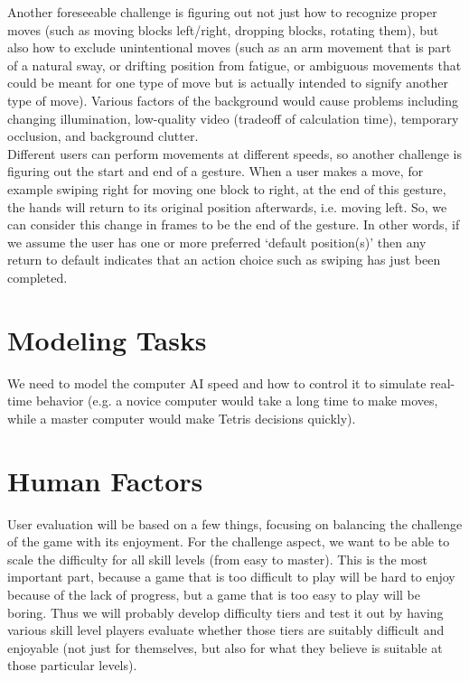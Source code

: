 \documentclass{article}
\begin{document}
	Another foreseeable challenge is figuring out not just how to recognize proper moves (such as moving blocks left/right, dropping blocks, rotating them), but also how to exclude unintentional moves (such as an arm movement that is part of a natural sway, or drifting position from fatigue, or ambiguous movements that could be meant for one type of move but is actually intended to signify another type of move). Various factors of the background would cause problems including changing illumination, low-quality video (tradeoff of calculation time), temporary occlusion, and background clutter.\\
	
	Different users can perform movements at different speeds, so another challenge is figuring out the start and end of a gesture. When a user makes a move, for example swiping right for moving one block to right, at the end of this gesture, the hands will return to its original position afterwards, i.e. moving left. So, we can consider this change in frames to be the end of the gesture. In other words, if we assume the user has one or more preferred ‘default position(s)’ then any return to default indicates that an action choice such as swiping has just been completed.\\
	
	
	\section{Modeling Tasks}
	We need to model the computer AI speed and how to control it to simulate real-time behavior (e.g. a novice computer would take a long time to make moves, while a master computer would make Tetris decisions quickly).\\
	\section{Human Factors}
	User evaluation will be based on a few things, focusing on balancing the challenge of the game with its enjoyment. For the challenge aspect, we want to be able to scale the difficulty for all skill levels (from easy to master). This is the most important part, because a game that is too difficult to play will be hard to enjoy because of the lack of progress, but a game that is too easy to play will be boring. Thus we will probably develop difficulty tiers and test it out by having various skill level players evaluate whether those tiers are suitably difficult and enjoyable (not just for themselves, but also for what they believe is suitable at those particular levels).\\
	
\end{document}
